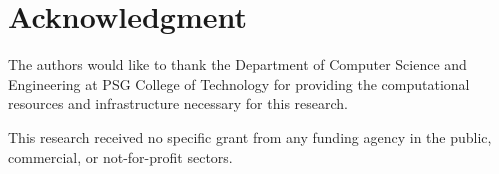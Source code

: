 \documentclass[conference]{IEEEtran}
\begin{document}
\section*{Acknowledgment}

The authors would like to thank the Department of Computer Science and Engineering at PSG College of Technology for providing the computational resources and infrastructure necessary for this research. 

This research received no specific grant from any funding agency in the public, commercial, or not-for-profit sectors.

\end{document}

